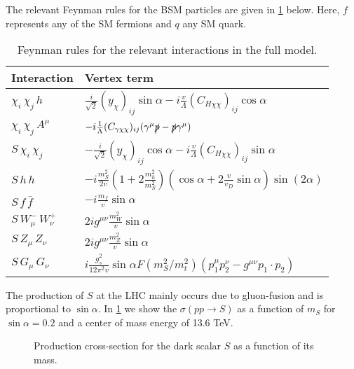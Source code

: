 \documentclass[a4paper,11pt]{article}
\begin{document}
The relevant Feynman rules for the BSM particles are given in \cref{tab:feynmanRules} below. Here, $f$ represents any of the SM fermions and $q$ any SM quark.

\begin{table}[h!]   \centering
    \vspace{0.2cm}
    \begin{tabular}{p{2cm}|p{8.5cm}}
      \toprule
      \textbf{Interaction} & \textbf{Vertex term}\\ \toprule 
      $\chi_i\,\chi_j\,h$  & $ \frac{i}{\sqrt{2}} (y_{\chi})_{ij} \sin\alpha -i \frac{v}{\Lambda} (C_{H\chi\chi})_{ij} \cos\alpha $\\
      $\chi_i\,\chi_j\, A^\mu$  & $-i \frac{1}{\Lambda} (C_{\gamma\chi\chi})_{ij} (\gamma^\mu \slashed{p} - \slashed{p} \gamma^\mu)$\\
      $S\,\chi_i\,\chi_j$  & $ -\frac{i}{\sqrt{2}} (y_{\chi})_{ij} \cos\alpha -i \frac{v}{\Lambda} (C_{H\chi\chi})_{ij} \sin\alpha $\\      
      $S\,h\,h$  & $- i \frac{m_{S}^{2}}{2 v}  \left( 1 + 2 \frac{m_{h}^{2}}{m_{S}^{2}}\right)  \left( \cos\alpha + 2 \frac{v}{v_D} \sin\alpha \right)  \sin (2\alpha)$\\
      $S\,f\,\bar{f}$  & $-i \frac{m_f}{v} \sin\alpha$ \\      
      $S\,W_\mu^-\,W_\nu^+$  & $2 i g^{\mu\nu} \frac{m_{W}^2}{v} \sin\alpha$\\
      $S\,Z_\mu\,Z_\nu$  & $2 i g^{\mu\nu} \frac{m_{Z}^2}{v} \sin\alpha$\\
      $S\,G_\mu\,G_\nu$  & $i \frac{g_s^2}{12 \pi^2 v} \sin\alpha F(m^2_S/m^2_t) (p_1^\mu p_2^\nu - g^{\mu\nu} p_1\cdot p_2) $\\
      \bottomrule        
    \end{tabular}
    \caption{Feynman rules for the relevant interactions in the full model. \label{tab:feynmanRules}}
\end{table}

The production of $S$ at the LHC mainly occurs due to gluon-fusion and is proportional to $\sin\alpha$. 
In \cref{fig:xsec_s} we show the $\sigma(p p \to S)$ as a function of $m_S$ for $\sin\alpha = 0.2$ and a center of mass energy of 13.6 TeV.

\begin{figure}
	\centering
	\caption{Production cross-section for the dark scalar $S$ as a function of its mass.} \label{fig:xsec_s}
\end{figure}
\end{document}
